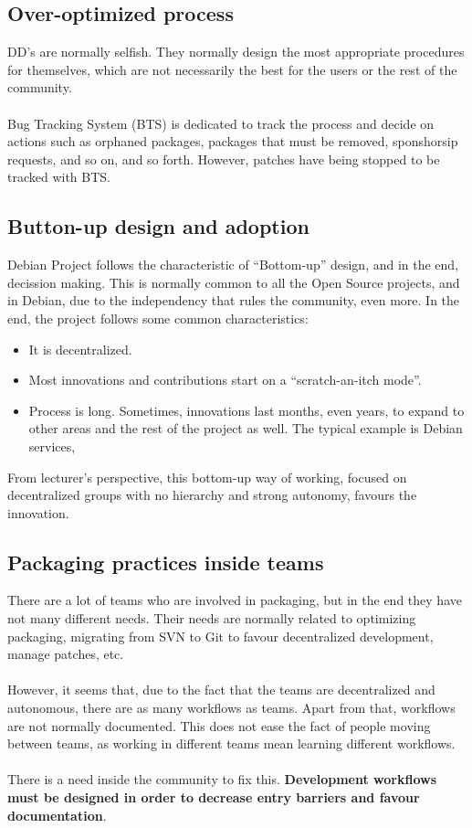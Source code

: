\documentclass[11pt]{article}
\begin{document}
\subsection{Over-optimized process}
DD's are normally selfish. They normally design the most appropriate procedures for themselves, which are not necessarily the best for the users or the rest of the community.\\
\\
Bug Tracking System (BTS) is dedicated to track the process and decide on actions such as orphaned packages, packages that must be removed, sponshorsip requests, and so on, and so forth. However, patches have being stopped to be tracked with BTS.

\subsection{Button-up design and adoption}
Debian Project follows the characteristic of ``Bottom-up'' design, and in the end, decission making. This is normally common to all the Open Source projects, and in Debian, due to the independency that rules the community, even more. In the end, the project follows some common characteristics:
\begin{itemize}\itemsep0pt
\item{It is decentralized.}
\item{Most innovations and contributions start on a ``scratch-an-itch mode''.}
\item{Process is long.} Sometimes, innovations last months, even years, to expand to other areas and the rest of the project as well. The typical example is Debian services, 
\end{itemize}
From lecturer's perspective, this bottom-up way of working, focused on decentralized groups with no hierarchy and strong autonomy, favours the innovation.

\subsection{Packaging practices inside teams}
There are a lot of teams who are involved in packaging, but in the end they have not many different needs. Their needs are normally related to optimizing packaging, migrating from SVN to Git to favour decentralized development, manage patches, etc.\\
\\
However, it seems that, due to the fact that the teams are decentralized and autonomous, there are as many workflows as teams. Apart from that, workflows are not normally documented. This does not ease the fact of people moving between teams, as working in different teams mean learning different workflows.\\
\\
There is a need inside the community to fix this. \textbf{Development workflows must be designed in order to decrease entry barriers and favour documentation}.
\end{document}
